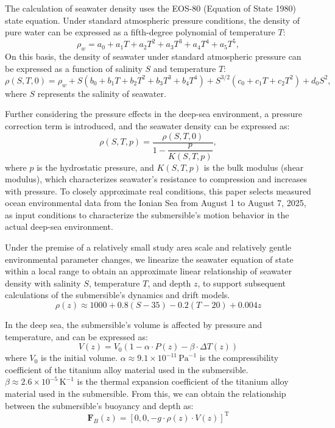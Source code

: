 \documentclass{mcmthesis}
\begin{document}
The calculation of seawater density uses the EOS-80 (Equation of State 1980) state equation.
Under standard atmospheric pressure conditions, the density of pure water can be expressed as a fifth-degree polynomial of temperature $T$:
\begin{equation}
\rho_w = a_0 + a_1 T + a_2 T^2 + a_3 T^3 + a_4 T^4 + a_5 T^5 ,
\end{equation}
On this basis, the density of seawater under standard atmospheric pressure can be expressed as a function of salinity $S$ and temperature $T$:
\begin{equation}
\rho(S,T,0)=\rho_w
+ S \left( b_0 + b_1 T + b_2 T^2 + b_3 T^3 + b_4 T^4 \right)
+ S^{3/2} \left( c_0 + c_1 T + c_2 T^2 \right)
+ d_0 S^2 ,
\end{equation}
where $S$ represents the salinity of seawater.

Further considering the pressure effects in the deep-sea environment, a pressure correction term is introduced, and the seawater density can be expressed as:
\begin{equation}
\rho(S,T,p)=\frac{\rho(S,T,0)}{1-\dfrac{p}{K(S,T,p)}} ,
\end{equation}
where $p$ is the hydrostatic pressure, and $K(S,T,p)$ is the bulk modulus (shear modulus), which characterizes seawater's resistance to compression and increases with pressure.
To closely approximate real conditions, this paper selects measured ocean environmental data from the Ionian Sea from August 1 to August 7, 2025, as input conditions to characterize the submersible's motion behavior in the actual deep-sea environment.

Under the premise of a relatively small study area scale and relatively gentle environmental parameter changes, we linearize the seawater equation of state within a local range to obtain an approximate linear relationship of seawater density with salinity $S$, temperature $T$, and depth $z$, to support subsequent calculations of the submersible's dynamics and drift models.
\begin{equation}
  \rho(z)\approx1000+0.8(S-35)-0.2(T-20)+0.004z
\end{equation}

In the deep sea, the submersible's volume is affected by pressure and temperature, and can be expressed as:
\begin{equation}
  V(z)=V_0(1-\alpha\cdot P(z)-\beta\cdot\Delta T(z))
\end{equation}
where $V_0$ is the initial volume. $\alpha\approx9.1\times10^{-11}\,\mathrm{Pa}^{-1}$ is the compressibility coefficient of the titanium alloy material used in the submersible.
$\beta\approx2.6\times10^{-5}\,\mathrm{K}^{-1}$ is the thermal expansion coefficient of the titanium alloy material used in the submersible.
From this, we can obtain the relationship between the submersible's buoyancy and depth as:
\begin{equation}
  \bm{F}_{B}({z})=[0,0,-g\cdot\rho(z)\cdot V(z)]^{\mathrm{T}}
\end{equation}
\end{document}

